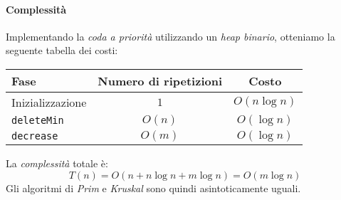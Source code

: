 \paragraph{Complessità}
Implementando la \emph{coda a priorità} utilizzando un \emph{heap binario},
otteniamo la seguente tabella dei costi:

\begin{table}[h!]
    \centering
    \renewcommand{\arraystretch}{1.2}
    \begin{tabular}{|l|c|c|}
        \hline
        \textbf{Fase} & \textbf{Numero di ripetizioni} & \textbf{Costo}\\
        \hline
        Inizializzazione & $1$ & $O(n\log n)$\\
        \hline
        \texttt{deleteMin} & $O(n)$ & $O(\log n)$\\
        \hline
        \texttt{decrease} & $O(m)$ & $O(\log n)$\\
        \hline
    \end{tabular}
\end{table}\noindent
La \emph{complessità} totale è:
\[T(n)=O(n+n\log n+m\log n)=O(m\log n)\]
Gli algoritmi di \emph{Prim} e \emph{Kruskal} sono quindi asintoticamente uguali.